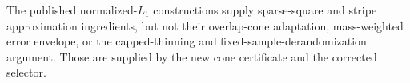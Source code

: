 The published normalized-\(L_1\) constructions supply sparse-square and stripe approximation ingredients, but not their overlap-cone adaptation, mass-weighted error envelope, or the capped-thinning and fixed-sample-derandomization argument.  Those are supplied by the new cone certificate and the corrected selector.